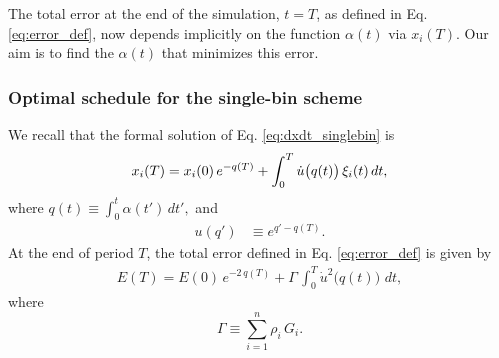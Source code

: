 \documentclass[reprint, superscriptaddress, floatfix]{revtex4-1}
\begin{document}
The total error
at the end of the simulation, $t = T$,
as defined in Eq. \eqref{eq:error_def},
now depends implicitly on the function $\alpha(t)$
via $x_i(T)$.
%
Our aim is to find the $\alpha(t)$
that minimizes this error.






\subsubsection{Optimal schedule for the single-bin scheme}



We recall that
the formal solution of Eq. \eqref{eq:dxdt_singlebin} is
%
\begin{equation}
x_i(T)
=
x_i(0) \, e^{-q(T)}
+
\int_0^T
  \dot u\bigl( q(t) \bigr) \, \xi_i(t) \, dt,
\notag
\end{equation}
%
where
%
$
q(t) \equiv \int_0^t \alpha(t') \, dt',
$
%
and
%
\begin{align}
u(q')
&\equiv
e^{q' - q(T)}.
\label{eq:u_def}
\end{align}
%
At the end of period $T$,
the total error defined in Eq. \eqref{eq:error_def}
is given by
%
%
\begin{align}
  E(T)
  =
  E(0) \, e^{-2 \, q(T)}
  +
  \Gamma \,
  \int_0^T
    {\dot u}^2\bigl( q(t) \bigr) \,
    \, dt
  ,
  \label{eq:ET_average}
\end{align}
where
\begin{equation}
  \Gamma \equiv \sum_{i=1}^n \rho_i \, G_i.
  \label{eq:Gamma_def}
\end{equation}
\end{document}
